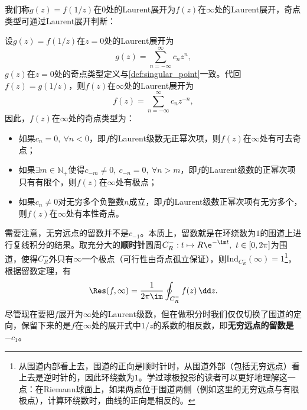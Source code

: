 我们称$g(z)=f(1/z)$在$0$处的Laurent展开为$f(z)$在$\infty$处的Laurent展开，奇点类型可通过Laurent展开判断：
\begin{definition}[无穷远点的Laurent展开与奇点类型]\label{def:singular_point_infty}
    设$g(z)=f(1/z)$在$z=0$处的Laurent展开为
    \begin{equation}
        g(z)=\sum_{n=-\infty}^{\infty}c_n z^n,
    \end{equation}
    $g(z)$在$z=0$处的奇点类型定义与\cref{def:singular_point}一致。代回$f(z)=g(1/z)$，则$f(z)$在$\infty$处的Laurent展开为
    \begin{equation}
        f(z)=\sum_{n=-\infty}^{\infty}c_n z^{-n},
    \end{equation}
    因此，$f(z)$在$\infty$处的奇点类型为：
    \begin{itemize}
        \item 如果$c_n=0,\ \forall n<0$，即$f$的Laurent级数无正幂次项，则$f(z)$在$\infty$处有可去奇点；
        \item 如果$\exists m\in\mathbb{N}_+$使得$c_{-m}\neq 0,\ c_{-n}=0,\ \forall n>m$，即$f$的Laurent级数的正幂次项只有有限个，则$f(z)$在$\infty$处有极点；
        \item 如果$c_n\neq 0$对无穷多个负整数$n$成立，即$f$的Laurent级数正幂次项有无穷多个，则$f(z)$在$\infty$处有本性奇点。
    \end{itemize}
\end{definition}

需要注意，无穷远点的留数并不是$c_{-1}$。本质上，留数就是在环绕数为$1$的围道上进行复线积分的结果。取充分大的\textbf{顺时针}圆周$C^-_R:t\mapsto R\e^{-\im t},\ t\in[0,2\pi]$为围道，使得$C^-_R$外只有$\infty$一个极点（可行性由奇点孤立保证），则$\mathrm{Ind}_{C^-_R}(\infty)=1$\footnote{从围道内部看上去，围道的正向是顺时针时，从围道外部（包括无穷远点）看上去是逆时针的，因此环绕数为$1$。学过球极投影的读者可以更好地理解这一点：在Riemann球面上，如果两点位于围道两侧（例如这里的无穷远点与有限极点），计算环绕数时，曲线的正向是相反的。}，根据留数定理，有
\begin{equation}\label{eq:res_infty}
    \Res(f,\infty)=\frac{1}{2\pi\im}\oint_{C^-_R}f(z)\,\dd z.
\end{equation}
尽管现在要把$f$展开为$\infty$处的Laurent级数，但在做积分时我们仅仅切换了围道的定向，保留下来的是$f$在$\infty$处的展开式中$1/z$的系数的相反数，即\textbf{无穷远点的留数是$-c_{1}$}。

